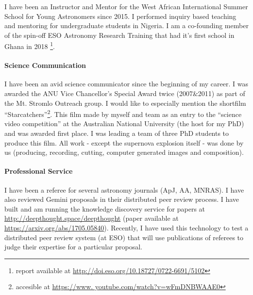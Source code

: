\documentclass[10pt]{article}
\begin{document}
I have been an Instructor and Mentor for the West African International Summer School for Young Astronomers since 2015. I performed inquiry based teaching and mentoring for undergraduate students in Nigeria. I am a co-founding member of the spin-off ESO Astronomy Research Training that had it's first school in Ghana in 2018
\footnote{report available at \url{http://doi.eso.org/10.18727/0722-6691/5102}}.

\paragraph{Science Communication}
I have been an avid science communicator since the beginning of my career. I was awarded the ANU Vice Chancellor’s Special Award twice (2007\&2011) as part of the Mt. Stromlo Outreach group.  
I would like to especially mention the shortfilm ``Starcatchers''\footnote{accesible at \url{https://www. youtube.com/watch?v=wFmDNBWAAE0}}. This film made by myself and team as an entry to the ``science video competition'' at the Australian National University (the host for my PhD) and was awarded first place. I was leading a team of three PhD students to produce this film. All work - except the supernova explosion itself - was done by us (producing, recording, cutting, computer generated images and composition).

\paragraph{Professional Service}

I have been a referee for several astronomy journals (ApJ, AA, MNRAS). I have also reviewed Gemini proposals in their distributed peer review process. I have built and am running the knowledge discovery service for papers at \url{http://deepthought.space/deepthought} (paper available at \url{https://arxiv.org/abs/1705.05840}).
Recently, I have used this technology to test a distributed peer review system (at ESO) that will use publications of referees to judge their expertise for a particular proposal. 

\end{document}
